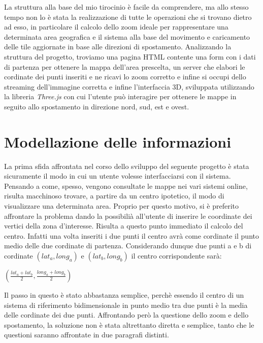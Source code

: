 La struttura alla base del mio tirocinio è facile da comprendere, ma allo stesso tempo non lo è stata la realizzazione di tutte le operazioni che si trovano dietro ad esso, in particolare il calcolo dello zoom ideale per rappresentare una determinata area geografica e il sistema alla base del movimento e caricamento delle tile aggiornate in base alle direzioni di spostamento. Analizzando la struttura del progetto, troviamo una pagina HTML contente una form con i dati di partenza per ottenere la mappa dell'area prescelta, un server che elabori le cordinate dei punti inseriti e ne ricavi lo zoom corretto e infine si occupi dello streaming dell'immagine corretta e infine l'interfaccia 3D, sviluppata utilizzando la libreria \textit{Three.js} con cui l'utente può interagire per ottenere le mappe in seguito allo spostamento in direzione nord, sud, est e ovest.

\section{Modellazione delle informazioni}
La prima sfida affrontata nel corso dello sviluppo del seguente progetto è stata sicuramente il modo in cui un utente volesse interfacciarsi con il sistema. Pensando a come, spesso, vengono consultate le mappe nei vari sistemi online, risulta macchinoso trovare, a partire da un centro ipotetico, il modo di visualizzare una determinata area. Proprio per questo motivo, si è preferito affrontare la problema dando la possibilià all'utente di inserire le coordinate dei vertici della zona d'interesse. Risulta a questo punto immediato il calcolo del centro. Infatti una volta inseriti i due punti il centro avrà come cordinate il punto medio delle due cordinate di partenza. Considerando dunque due punti a e b di cordinate $(lat_{a}, long_{a})$ e $(lat_{b}, long_{b})$ il centro corrispondente sarà:
\begin{center}

	\LARGE$(\frac{lat_{a}+lat_{b}}{2} , \frac{long_{a}+long_{b}}{2})$\par

\end{center}
Il passo in questo è stato abbastanza semplice, perchè essendo il centro di un sistema di riferimento bidimensionale in punto medio tra due punti è la media delle cordinate dei due punti. Affrontando però la questione dello zoom e dello spostamento, la soluzione non è stata altrettanto diretta e semplice, tanto che le questioni saranno affrontate in due paragrafi distinti.

